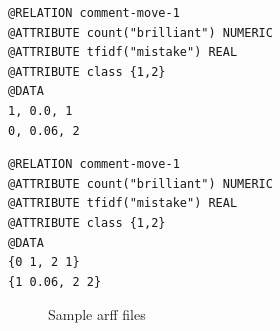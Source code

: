 \documentclass[article,type=msc,colorback,accentcolor=tud7b]{tudthesis}
\begin{document}
    \newsavebox{\complete}
      \begin{lrbox}{\complete}
        \begin{lstlisting}
@RELATION comment-move-1
@ATTRIBUTE count("brilliant") NUMERIC
@ATTRIBUTE tfidf("mistake") REAL
@ATTRIBUTE class {1,2}
@DATA
1, 0.0, 1
0, 0.06, 2	  
        \end{lstlisting}      
      \end{lrbox}
    \newsavebox{\sparse}
      \begin{lrbox}{\sparse}
        \begin{lstlisting}
@RELATION comment-move-1
@ATTRIBUTE count("brilliant") NUMERIC
@ATTRIBUTE tfidf("mistake") REAL
@ATTRIBUTE class {1,2}
@DATA
{0 1, 2 1}
{1 0.06, 2 2}	  
        \end{lstlisting}        
      \end{lrbox}    
    
    \begin{figure}[H]
	  \centering      
	  \subfloat[complete]{\usebox{\complete}\label{fig:sample_arff_file_complete}}
	  \quad
	  \subfloat[sparse]{\usebox{\sparse}\label{fig:sample_arff_file_sparse}}
      \caption{Sample arff files}
      \label{fig:sample_arff_files}
	\end{figure}
    
\end{document}
